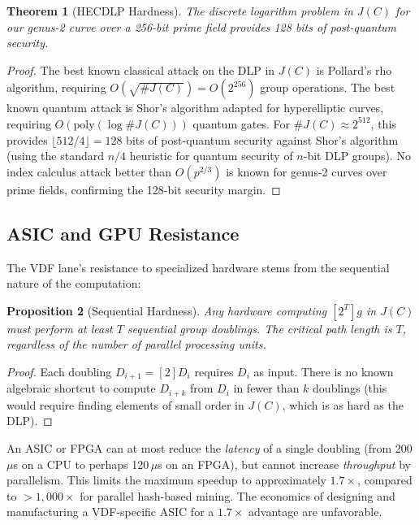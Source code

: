 \documentclass[11pt,a4paper]{article}
\newtheorem{theorem}{Theorem}[section]
\newtheorem{proposition}[theorem]{Proposition}
\begin{document}
\begin{theorem}[HECDLP Hardness]
The discrete logarithm problem in $J(C)$ for our genus-2 curve over a 256-bit prime field provides 128 bits of post-quantum security.
\end{theorem}

\begin{proof}
The best known classical attack on the DLP in $J(C)$ is Pollard's rho algorithm, requiring $O(\sqrt{\#J(C)}) = O(2^{256})$ group operations. The best known quantum attack is Shor's algorithm adapted for hyperelliptic curves, requiring $O(\mathrm{poly}(\log \#J(C)))$ quantum gates. For $\#J(C) \approx 2^{512}$, this provides $\lfloor 512/4 \rfloor = 128$ bits of post-quantum security against Shor's algorithm (using the standard $n/4$ heuristic for quantum security of $n$-bit DLP groups). No index calculus attack better than $O(p^{2/3})$ is known for genus-2 curves over prime fields, confirming the 128-bit security margin.
\end{proof}

\subsection{ASIC and GPU Resistance}

The VDF lane's resistance to specialized hardware stems from the sequential nature of the computation:

\begin{proposition}[Sequential Hardness]
Any hardware computing $[2^T]g$ in $J(C)$ must perform at least $T$ sequential group doublings. The critical path length is $T$, regardless of the number of parallel processing units.
\end{proposition}

\begin{proof}
Each doubling $D_{i+1} = [2]D_i$ requires $D_i$ as input. There is no known algebraic shortcut to compute $D_{i+k}$ from $D_i$ in fewer than $k$ doublings (this would require finding elements of small order in $J(C)$, which is as hard as the DLP).
\end{proof}

An ASIC or FPGA can at most reduce the \emph{latency} of a single doubling (from 200\,$\mu$s on a CPU to perhaps 120\,$\mu$s on an FPGA), but cannot increase \emph{throughput} by parallelism. This limits the maximum speedup to approximately $1.7\times$, compared to $>1{,}000\times$ for parallel hash-based mining. The economics of designing and manufacturing a VDF-specific ASIC for a $1.7\times$ advantage are unfavorable.
\end{document}
